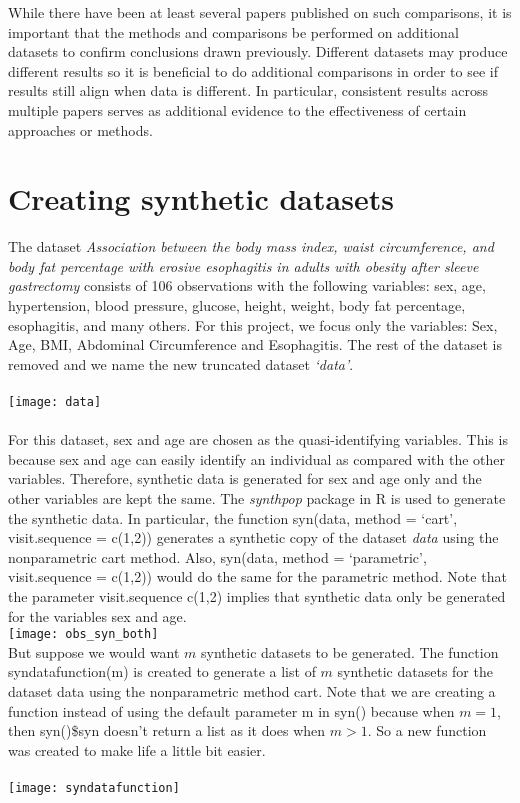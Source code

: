 \documentclass[12pt]{article}
\begin{document}
While there have been at least several papers published on such comparisons, it is important that the methods and comparisons be performed on additional datasets to confirm conclusions drawn previously. Different datasets may produce different results so it is beneficial to do additional comparisons in order to see if results still align when data is different. In particular, consistent results across multiple papers serves as additional evidence to the effectiveness of certain approaches or methods.

\section*{Creating synthetic datasets}

The dataset \textit{Association between the body mass index, waist circumference, and body fat percentage with erosive esophagitis in adults with obesity after sleeve gastrectomy} consists of 106 observations with the following variables: sex, age, hypertension, blood pressure, glucose, height, weight, body fat percentage, esophagitis, and many others. For this project, we focus only the variables: Sex, Age, BMI, Abdominal Circumference and Esophagitis. The rest of the dataset is removed and we name the new truncated dataset \textit{‘data’}.\\\\
\texttt{[image: data]}\\\\

For this dataset, sex and age are chosen as the quasi-identifying variables. This is because sex and age can easily identify an individual as compared with the other variables. Therefore, synthetic data is generated for sex and age only and the other variables are kept the same. 
The \textit{synthpop} package in R is used to generate the synthetic data. In particular, the function syn(data, method = ‘cart’, visit.sequence = c(1,2)) generates a synthetic copy of the dataset \textit{data} using the nonparametric cart method. Also, syn(data, method = ‘parametric’, visit.sequence = c(1,2)) would do the same for the parametric method. Note that the parameter visit.sequence c(1,2) implies that synthetic data only be generated for the variables sex and age.\\
\texttt{[image: obs\_syn\_both]}\\

But suppose we would want $m$ synthetic datasets to be generated. The function syndatafunction(m) is created to generate a list of $m$ synthetic datasets for the dataset data using the nonparametric method cart. Note that we are creating a function instead of using the default parameter m in syn() because when $m=1$, then syn()\$syn doesn’t return a list as it does when $m>1$. So a new function was created to make life a little bit easier.\\\\
\texttt{[image: syndatafunction]}\\\\
\end{document}
